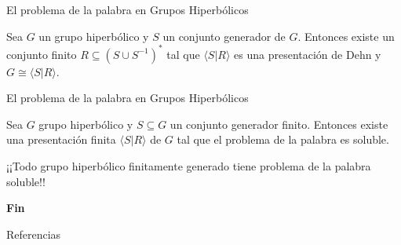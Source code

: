 \documentclass[xcolor=dvipsnames]{beamer}
\theoremstyle{largebreak}
\newcommand{\gen}[1]{\ensuremath{\langle#1\rangle}}
\begin{document}
\begin{frame}{El problema de la palabra en Grupos Hiperbólicos}
    \begin{theor}
        Sea $G$ un grupo hiperbólico y $S$ un conjunto generador de $G$. Entonces existe un conjunto finito $R\subseteq(S\cup S^{-1})^*$ tal que $\gen{S|R}$ es una presentación de Dehn y $G\cong\gen{S|R}$.
    \end{theor}
\end{frame}

\begin{frame}{El problema de la palabra en Grupos Hiperbólicos}
    \begin{cor}
        Sea $G$ grupo hiperbólico y $S\subseteq G$ un conjunto generador finito. Entonces existe una presentación finita $\gen{S|R}$ de $G$ tal que el problema de la palabra es soluble.
    \end{cor}

    \pause

    \begin{center}
        ¡¡Todo grupo hiperbólico finitamente generado tiene problema de la palabra soluble!!
    \end{center}
\end{frame}

\begin{frame}
    \Huge{\centerline{\textbf{Fin}}}
\end{frame}

\begin{frame}{Referencias}
    \footnotesize
    
    
\end{frame}
\end{document}

